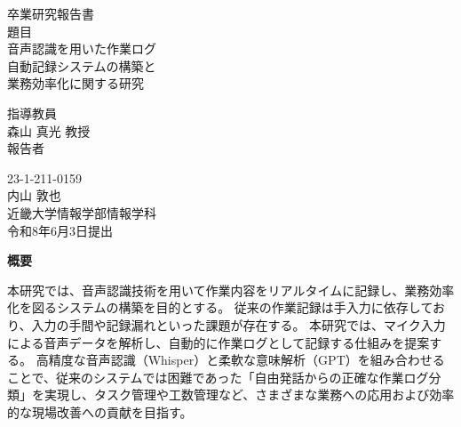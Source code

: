 \documentclass[a4paper,12pt,ja=standard,lualatex]{bxjsarticle}
\begin{document}
\pagestyle{empty}

\begin{center}
\vspace*{1cm}
\large
{\LARGE 卒業研究報告書}\\
\vspace*{0.8cm}
題目\\
\vspace*{1cm}
{\Huge{音声認識を用いた作業ログ}}\\
{\Huge{自動記録システムの構築と}}\\
{\Huge{業務効率化に関する研究}}\\
\vspace{3mm}

\vspace*{3cm}
指導教員\\
\vspace*{0.3cm}
{\LARGE 森山 真光 教授}\\ 
\vspace*{3cm}
報告者\\
\vspace*{0.3cm}

{23-1-211-0159}\\
\vspace*{0.3cm}
{\Huge 内山 敦也}\\
\vspace*{0.5cm}
近畿大学情報学部情報学科\\
\vspace*{2cm}
令和8年6月3日提出\\
\end{center}

\newpage
\normalsize

\clearpage
\begin{center}
{\bf \Large 概要}
\end{center} 
本研究では、音声認識技術を用いて作業内容をリアルタイムに記録し、業務効率化を図るシステムの構築を目的とする。
従来の作業記録は手入力に依存しており、入力の手間や記録漏れといった課題が存在する。
本研究では、マイク入力による音声データを解析し、自動的に作業ログとして記録する仕組みを提案する。
高精度な音声認識（Whisper）と柔軟な意味解析（GPT）を組み合わせることで、従来のシステムでは困難であった「自由発話からの正確な作業ログ分類」を実現し、タスク管理や工数管理など、さまざまな業務への応用および効率的な現場改善への貢献を目指す。
\end{document}
